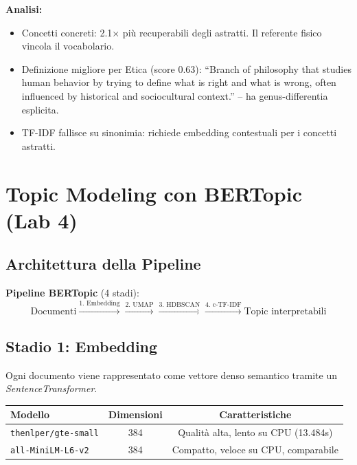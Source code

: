 \documentclass[12pt,a4paper]{article}
\begin{document}
\textbf{Analisi:}
\begin{itemize}
  \item Concetti concreti: 2.1$\times$ pi\`u recuperabili degli astratti. Il referente fisico vincola il vocabolario.
  \item Definizione migliore per Etica (score 0.63): ``Branch of philosophy that studies human behavior by trying to define what is right and what is wrong, often influenced by historical and sociocultural context.'' -- ha genus-differentia esplicita.
  \item TF-IDF fallisce su sinonimia: richiede embedding contestuali per i concetti astratti.
\end{itemize}

\section{Topic Modeling con BERTopic (Lab 4)}

\subsection{Architettura della Pipeline}\label{sec:bertopic-lab}

\begin{defbox}
\textbf{Pipeline BERTopic} (4 stadi):
\[
\text{Documenti} \xrightarrow{\text{1. Embedding}} \xrightarrow{\text{2. UMAP}} \xrightarrow{\text{3. HDBSCAN}} \xrightarrow{\text{4. c-TF-IDF}} \text{Topic interpretabili}
\]
\end{defbox}

\subsection{Stadio 1: Embedding}

Ogni documento viene rappresentato come vettore denso semantico tramite un \emph{SentenceTransformer}.

\begin{center}
\begin{tabular}{lcc}
\toprule
\textbf{Modello} & \textbf{Dimensioni} & \textbf{Caratteristiche} \\
\midrule
\texttt{thenlper/gte-small} & 384 & Qualit\`a alta, lento su CPU (13.484s) \\
\texttt{all-MiniLM-L6-v2} & 384 & Compatto, veloce su CPU, comparabile \\
\bottomrule
\end{tabular}
\end{center}
\end{document}
